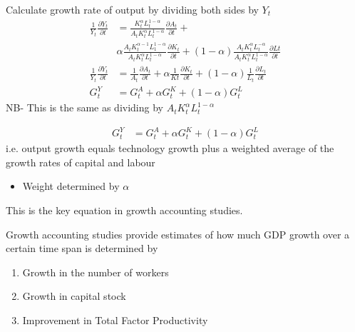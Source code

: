 \documentclass{beamer}
\begin{document}
\begin{frame}
 Calculate growth rate of output by dividing both sides by $Y_t$   
  \begin{align}
    \frac{1}{Y_t}\frac{\partial Y_t}{\partial t} & = \frac{K_t^{\alpha}L_t^{1-\alpha}}{A_tK_t^{\alpha}L_t^{1-\alpha}} \frac{\partial A_t}{\partial t} + \\ \nonumber & \alpha \frac{A_tK_t^{\alpha-1}L_1^{1-\alpha}}{A_tK_t^{\alpha}L_t^{1-\alpha}} \frac{\partial K_t}{\partial t} + (1-\alpha) \frac{A_tK_t^{\alpha}L_t^{-\alpha}}{A_tK_t^{\alpha}L_t^{1-\alpha}} \frac{\partial Lt}{\partial t}\\ \nonumber
    \frac{1}{Y_t}\frac{\partial Y_t}{\partial t} & = \frac{1}{A_t}\frac{\partial A_t}{\partial t} + \alpha \frac{1}{Kt}\frac{\partial K_t}{\partial t} + (1-\alpha) \frac{1}{L_t}\frac{\partial L_t}{\partial t}\\  
    G_t ^Y &=G_t^A +\alpha G_t^K + (1-\alpha)G_t^L
\end{align}
  \medskip
  NB- This is the same as dividing by $A_tK_t^{\alpha}L_t^{1-\alpha}$
\end{frame}

\begin{frame}
  \begin{align}
    G_t ^Y &=G_t^A +\alpha G_t^K + (1-\alpha)G_t^L
  \end{align}
  i.e. output growth equals technology growth plus a weighted average of the growth rates of capital and labour
  \begin{itemize}
    \item Weight determined by $\alpha$
  \end{itemize}
  \medskip
  This is the key equation in growth accounting studies. 
\end{frame}

\begin{frame}
  Growth accounting studies provide estimates of how much GDP growth over a certain time span is determined by 
  \begin{enumerate}
    \item Growth in the number of workers
    \item Growth in capital stock
    \item Improvement in Total Factor Productivity
  \end{enumerate}
\end{frame}
\end{document}
